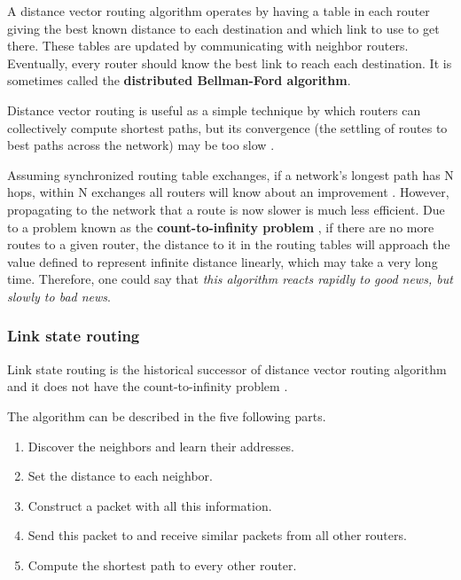 A distance vector routing algorithm operates by having a table in each router giving the best known distance to each destination and which link to use to get there.
These tables are updated by communicating with neighbor routers.
Eventually, every router should know the best link to reach each destination.
It is sometimes called the \textbf{distributed Bellman-Ford algorithm}.

Distance vector routing is useful as a simple technique by which routers can collectively compute shortest paths, but its convergence (the settling of routes to best paths across the network) may be too slow \cite[p.~372]{computer-networks-tanenbaum-2012}.

Assuming synchronized routing table exchanges, if a network's longest path has N hops, within N exchanges all routers will know about an improvement \cite[p.~372]{computer-networks-tanenbaum-2012}. However, propagating to the network that a route is now slower is much less efficient. Due to a problem known as the \textbf{count-to-infinity problem} \cite[p.~373]{computer-networks-tanenbaum-2012}, if there are no more routes to a given router, the distance to it in the routing tables will approach the value defined to represent infinite distance linearly, which may take a very long time. Therefore, one could say that \textit{this algorithm reacts rapidly to good news, but slowly to bad news}.

\subsubsection{Link state routing}\label{Link state routing}

Link state routing is the historical successor of distance vector routing algorithm and it does not have the count-to-infinity problem \cite[p.~373]{computer-networks-tanenbaum-2012}.

The algorithm can be described in the five following parts.

\begin{enumerate}
    \item Discover the neighbors and learn their addresses.
    \item Set the distance to each neighbor.
    \item Construct a packet with all this information.
    \item Send this packet to and receive similar packets from all other routers.
    \item Compute the shortest path to every other router.
\end{enumerate}

